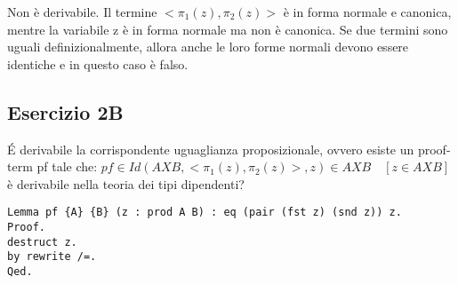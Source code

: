 Non è derivabile. Il termine $<\pi_1(z),\pi_2(z)>$ è in forma normale e canonica,
mentre la variabile z è in forma normale ma non è canonica.
Se due termini sono uguali definizionalmente, allora anche le loro forme normali
devono essere identiche e in questo caso è falso.

\subsection{Esercizio 2B}

\'{E} derivabile la corrispondente uguaglianza proposizionale, ovvero esiste un
proof-term pf tale che:
$pf \in Id(A X B, <\pi_1(z), \pi_2(z)>, z ) \in A X B \quad [z \in A X B]$ è
derivabile nella teoria dei tipi dipendenti?

\begin{lstlisting}[language=Coq]
Lemma pf {A} {B} (z : prod A B) : eq (pair (fst z) (snd z)) z.
Proof.
destruct z.
by rewrite /=.
Qed.
\end{lstlisting}
